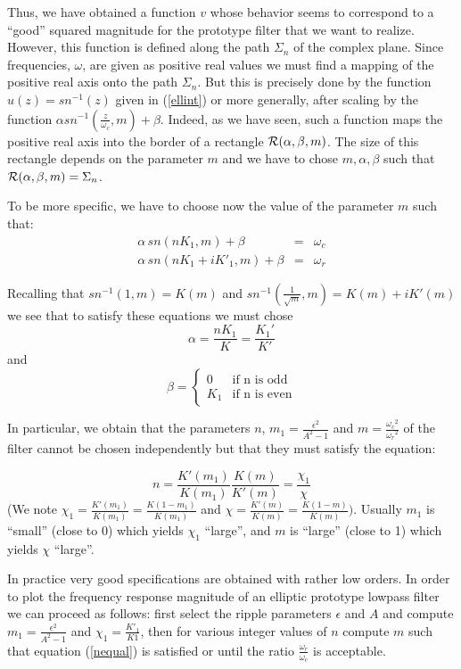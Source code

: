   Thus, we have obtained a function $v$ whose behavior seems to correspond to a ``good'' squared magnitude for the prototype filter that we want to realize.
However, this function is defined along the path $\Sigma_n$ of the complex plane.
Since frequencies, $\omega$, are given as positive real values we must find a mapping of the positive real axis onto the path $\Sigma_n$.
But this is precisely done by the function $u(z)=sn^{-1}(z)$ given in (\ref{ellint}) or more generally, after scaling by the function $\alpha sn^{-1}(\frac{z}{\omega_c},m) + \beta$.
Indeed, as we have seen, such a function maps the positive real axis into the border of a rectangle ${\cal R}(\alpha,\beta,m)$.  The size of this rectangle depends on the parameter $m$ and we have to chose $m,\alpha,\beta$ such that ${\cal R}(\alpha,\beta,m) = \Sigma_n$.

To be more specific, we have to choose now the value of the parameter $m$ such that:
\begin{eqnarray}
\alpha \, sn(nK_1,m) +\beta & = & \omega_c \\
\alpha \, sn(nK_1+i{K'}_1 ,m) +\beta & = & \omega_r
\end{eqnarray}

Recalling that $sn^{-1}(1,m) = K(m)$ and $sn^{-1}(\frac{1}{\sqrt{m}},m) =K(m) + iK'(m)$ we see that to satisfy these equations we must chose 
\[ \alpha = \frac{nK_1}{K} = \frac{{K_1}'}{K'}\]
and 
\[ \beta = \left\{ \begin{array}{ll}
          0  & \mbox{if n is odd} \\
         K_1 & \mbox{if n is even}
                   \end{array}
           \right. \]

 In particular, we obtain that the parameters $n$,
$m_1 = \frac{\epsilon^2}{A^2-1}$ and $m = \frac{{\omega_c}^2}{{\omega_r}^2}$ 
of the filter cannot be chosen independently but that they must satisfy the equation:

\begin{equation}
n = \frac{{K'(m_1)}}{K(m_1)} \frac{K(m)}{K'(m)} = \frac{\chi_1}{\chi}
\label{nequal}
\end{equation}
  (We note $\chi_1 = \frac{K'(m_1)}{K(m_1)} = \frac{K(1-m_1)}{K(m_1)} $ and $\chi = \frac{K'(m)}{K(m)} = \frac{K(1-m)}{K(m)})$.
Usually $m_1$ is ``small'' (close to 0) which yields $\chi_1$ ``large'', and $m$ is ``large'' (close to 1) which yields $\chi$ ``large''.

In practice very good specifications are obtained with rather low orders.
In order to plot the frequency response magnitude of an elliptic prototype lowpass filter we can proceed as follows: first select the ripple parameters $\epsilon$ and $A$ and compute 
$ m_1 = \frac{\epsilon^2}{A^2-1}$
 and $\chi_1 = \frac{K'_1}{K1}$, then for various integer values of $n$ compute $m$ such that equation (\ref{nequal}) is satisfied or until the ratio $\frac{\omega_r}{\omega_c}$ is acceptable.


